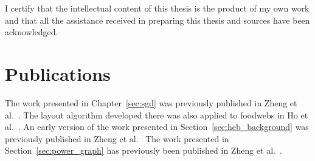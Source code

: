 I certify that the intellectual content of this thesis is the product of my own work and that all the assistance received in preparing this thesis and sources have been acknowledged.

\section{Publications}

The work presented in Chapter~\ref{sec:sgd} was previously published in Zheng et al.\ \cite{Zheng2019Stochastic}. The layout algorithm developed there was also applied to foodwebs in Ho et al.\ \cite{Ho2019}.
An early version of the work presented in Section~\ref{sec:heb_background} was previously published in Zheng et al.\ \cite{Zheng2018}
The work presented in Section~\ref{sec:power_graph} has previously been published in Zheng et al.\ \cite{Zheng2019Power}.